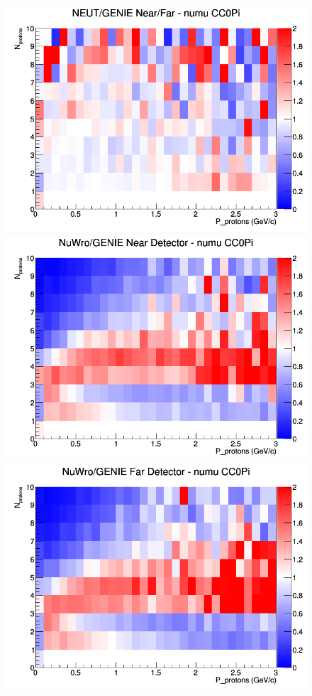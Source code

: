 \begin{figure}[h]
\endminipage
{}
\includegraphics[width=\linewidth]{N_P/nominal/protons/ratios/CC0Pi_NEUT_GENIE_numu_NF_N_P.png}
\endminipage
\newline
{}
\includegraphics[width=\linewidth]{N_P/nominal/protons/ratios/CC0Pi_NuWro_GENIE_numu_near_N_P.png}
\endminipage
{}
\includegraphics[width=\linewidth]{N_P/nominal/protons/ratios/CC0Pi_NuWro_GENIE_numu_far_N_P.png}

\end{figure}
